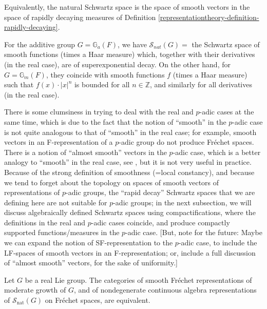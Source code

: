 Equivalently, the natural Schwartz space is the space of smooth vectors in the space of rapidly decaying measures of Definition \ref{representationtheory-definition-rapidly-decaying}. 


\begin{example}
 \label{example-natural-Schwartz-additive-multiplicative}
For the additive group $G=\mathbb G_a(F)$, we have $\mathcal S_{nat}(G)=$ the Schwartz space of smooth functions (times a Haar measure) which, together with their derivatives (in the real case), are of superexponential decay. On the other hand, for $G=\mathbb G_m(F)$, they coincide with smooth functions $f$ (times a Haar measure) such that $f(x)\cdot |x|^n$ is bounded for all $n\in \mathbb Z$, and similarly for all derivatives (in the real case).
\end{example}

\begin{remark}
 \label{remark-almost-smooth}
There is some clumsiness in trying to deal with the real and $p$-adic cases at the same time, which is due to the fact that the notion of ``smooth'' in the $p$-adic case is not quite analogous to that of ``smooth'' in the real case; for example, smooth vectors in an F-representation of a $p$-adic group do not produce Fr\'echet spaces. There is a notion of ``almost smooth'' vectors in the $p$-adic case, which is a better analogy to ``smooth'' in the real case, see \cite{}, but it is not very useful in practice. Because of the strong definition of smoothness (=local constancy), and because we tend to forget about the topology on spaces of smooth vectors of representations of $p$-adic groups, the ``rapid decay'' Schwartz spaces that we are defining here are not suitable for $p$-adic groups; in the next subsection, we will discuss algebraically defined Schwartz spaces using compactifications, where the definitions in the real and $p$-adic cases coincide, and produce compactly supported functions/measures in the $p$-adic case. [But, note for the future: Maybe we can expand the notion of SF-representation to the $p$-adic case, to include the LF-spaces of smooth vectors in an F-representation; or, include a full discussion of ``almost smooth'' vectors, for the sake of uniformity.]
\end{remark}



\begin{proposition}
 \label{proposition-SF-Schwartz-equivalence}
Let $G$ be a real Lie group. The categories of smooth Fr\'echet representations of moderate growth of $G$, and of nondegenerate continuous algebra representations of $\mathcal S_{\text{nat}}(G)$ on Fr\'echet spaces, are equivalent.
\end{proposition}

